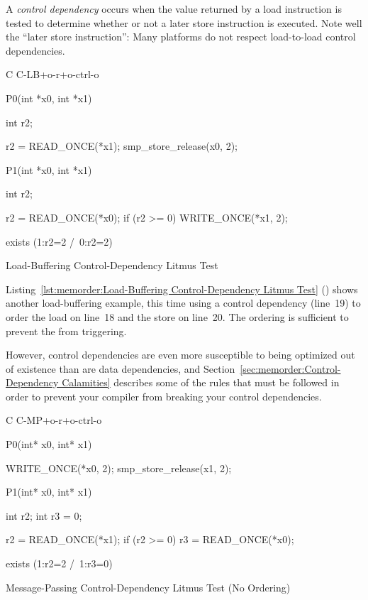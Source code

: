 A \emph{control dependency} occurs when the value returned by a load
instruction is tested to determine whether or not a later store instruction
is executed.
Note well the ``later store instruction'': Many platforms do not respect
load-to-load control dependencies.

\begin{listing}[tbp]
{ \scriptsize
\begin{verbbox}[\LstLineNo]
C C-LB+o-r+o-ctrl-o
{
}

P0(int *x0, int *x1)
{
  int r2;

  r2 = READ_ONCE(*x1);
  smp_store_release(x0, 2);
}


P1(int *x0, int *x1)
{
  int r2;

  r2 = READ_ONCE(*x0);
  if (r2 >= 0)
    WRITE_ONCE(*x1, 2);
}

exists (1:r2=2 /\ 0:r2=2)
\end{verbbox}
}
\centering
\theverbbox
\caption{Load-Buffering Control-Dependency Litmus Test}
\label{lst:memorder:Load-Buffering Control-Dependency Litmus Test}
\end{listing}

Listing~\ref{lst:memorder:Load-Buffering Control-Dependency Litmus Test}
()
shows another load-buffering example, this time using a control
dependency (line~19) to order the load on line~18 and the store on
line~20.
The ordering is sufficient to prevent the  from triggering.

However, control dependencies are even more susceptible to being optimized
out of existence than are data dependencies, and
Section~\ref{sec:memorder:Control-Dependency Calamities}
describes some of the rules that must be followed in order to prevent
your compiler from breaking your control dependencies.

\begin{listing}[tbp]
{ \scriptsize
\begin{verbbox}[\LstLineNo]
C C-MP+o-r+o-ctrl-o

{
}

P0(int* x0, int* x1) {

  WRITE_ONCE(*x0, 2);
  smp_store_release(x1, 2);

}

P1(int* x0, int* x1) {
  int r2;
  int r3 = 0;

  r2 = READ_ONCE(*x1);
  if (r2 >= 0)
    r3 = READ_ONCE(*x0);

}

exists (1:r2=2 /\ 1:r3=0)
\end{verbbox}
}
\centering
\theverbbox
\caption{Message-Passing Control-Dependency Litmus Test (No Ordering)}
\label{lst:memorder:Message-Passing Control-Dependency Litmus Test (No Ordering)}
\end{listing}

